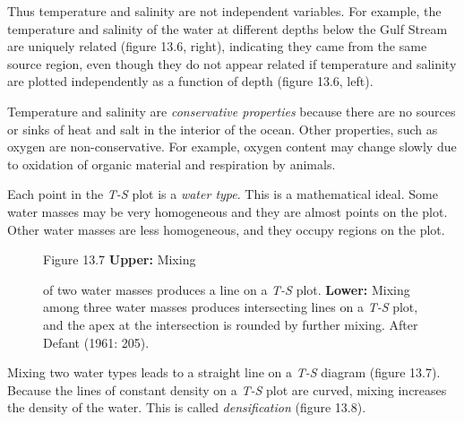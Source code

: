 Thus temperature and salinity are not independent variables. For
example, the temperature and salinity of the water at different depths below
the Gulf Stream are uniquely related (figure 13.6, right),
indicating they came from the same source region, even though they do not appear related if
temperature and salinity are plotted independently as a function of depth
(figure 13.6, left).

Temperature and salinity are
\textit{conservative properties} because there are no
sources or sinks of heat and salt in the interior of the ocean. Other properties, such as
oxygen are non-conservative. For example, oxygen content may change slowly due to oxidation of
organic material and respiration by animals.

Each point in the \textit{T-S} plot is a \textit{water
type}. This is a mathematical ideal. Some
water masses may be very homogeneous and they are almost points on the plot. Other water
masses are less homogeneous, and they occupy regions on the plot.

\begin{figure}[t!]
\footnotesize
Figure 13.7 \textbf{Upper:} Mixing \rule{0mm}{3ex}of two water
masses produces a line on a \textit{T-S} plot. \textbf{Lower:} Mixing among three
water masses produces intersecting lines on a \textit{T-S} plot, and the apex at
the intersection is rounded by further mixing. After Defant
(1961: 205).
\label{fig:TSsketch}
\vspace{-3ex}
\end{figure}

Mixing two water types leads to a straight line on a \textit{T-S}
diagram (figure 13.7). Because the lines of constant density on a \textit{T-S} plot are
curved, mixing increases the density of the water. This is
called
\textit{densification} (figure 13.8).

